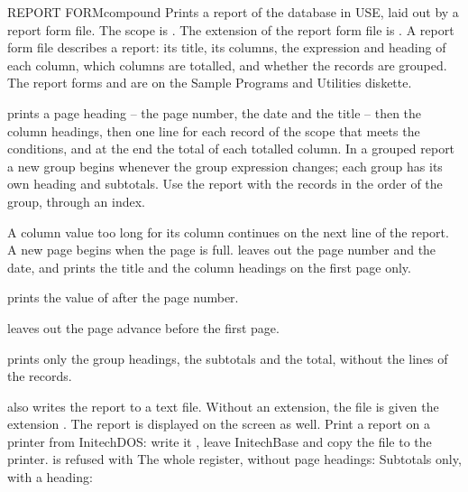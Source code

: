 \begin{XbaseEntry}{REPORT FORM}{compound}
%
Prints a report of the database in USE, laid out by a report form file.
\Syntax
{}
\Defaults
The scope is .  The extension of the report form file is
.
\Usage
A report form file describes a report: its title, its columns, the expression
and heading of each column, which columns are totalled, and whether the
records are grouped.  The report forms  and
 are on the Sample Programs and Utilities diskette.

 prints a page heading -- the page number, the date and the
title -- then the column headings, then one line for each record of the scope
that meets the conditions, and at the end the total of each totalled column.
In a grouped report a new group begins whenever the group expression changes;
each group has its own heading and subtotals.  Use the report with the records
in the order of the group, through an index.

A column value too long for its column continues on the next line of the
report.  A new page begins when the page is full.
\Options
{} leaves out the page number and the date, and prints the title and
the column headings on the first page only.

  prints the value of  after the page number.

 leaves out the page advance before the first page.

 prints only the group headings, the subtotals and the total,
without the lines of the records.

  also writes the report to a text file.  Without an
extension, the file is given the extension .  The report is
displayed on the screen as well.
\Tips
Print a report on a printer from InitechDOS: write it , leave
InitechBase and copy the file to the printer.   is refused with
\Examples
{}
The whole register, without page headings:
Subtotals only, with a heading:
\end{XbaseEntry}

